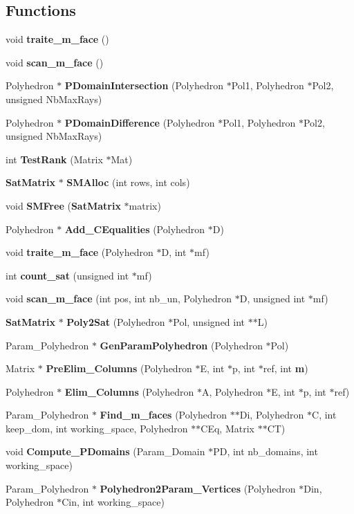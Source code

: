 \subsection*{Functions}
\begin{CompactItemize}
\item 
void {\bf traite\_\-m\_\-face} ()
\item 
void {\bf scan\_\-m\_\-face} ()
\item 
Polyhedron $\ast$ {\bf PDomain\-Intersection} (Polyhedron $\ast$Pol1, Polyhedron $\ast$Pol2, unsigned Nb\-Max\-Rays)
\item 
Polyhedron $\ast$ {\bf PDomain\-Difference} (Polyhedron $\ast$Pol1, Polyhedron $\ast$Pol2, unsigned Nb\-Max\-Rays)
\item 
int {\bf Test\-Rank} (Matrix $\ast$Mat)
\item 
{\bf Sat\-Matrix} $\ast$ {\bf SMAlloc} (int rows, int cols)
\item 
void {\bf SMFree} ({\bf Sat\-Matrix} $\ast$matrix)
\item 
Polyhedron $\ast$ {\bf Add\_\-CEqualities} (Polyhedron $\ast$D)
\item 
void {\bf traite\_\-m\_\-face} (Polyhedron $\ast$D, int $\ast$mf)
\item 
int {\bf count\_\-sat} (unsigned int $\ast$mf)
\item 
void {\bf scan\_\-m\_\-face} (int pos, int nb\_\-un, Polyhedron $\ast$D, unsigned int $\ast$mf)
\item 
{\bf Sat\-Matrix} $\ast$ {\bf Poly2Sat} (Polyhedron $\ast$Pol, unsigned int $\ast$$\ast$L)
\item 
Param\_\-Polyhedron $\ast$ {\bf Gen\-Param\-Polyhedron} (Polyhedron $\ast$Pol)
\item 
Matrix $\ast$ {\bf Pre\-Elim\_\-Columns} (Polyhedron $\ast$E, int $\ast$p, int $\ast$ref, int {\bf m})
\item 
Polyhedron $\ast$ {\bf Elim\_\-Columns} (Polyhedron $\ast$A, Polyhedron $\ast$E, int $\ast$p, int $\ast$ref)
\item 
Param\_\-Polyhedron $\ast$ {\bf Find\_\-m\_\-faces} (Polyhedron $\ast$$\ast$Di, Polyhedron $\ast$C, int keep\_\-dom, int working\_\-space, Polyhedron $\ast$$\ast$CEq, Matrix $\ast$$\ast$CT)
\item 
void {\bf Compute\_\-PDomains} (Param\_\-Domain $\ast$PD, int nb\_\-domains, int working\_\-space)
\item 
Param\_\-Polyhedron $\ast$ {\bf Polyhedron2Param\_\-Vertices} (Polyhedron $\ast$Din, Polyhedron $\ast$Cin, int working\_\-space)

\end{CompactItemize}
